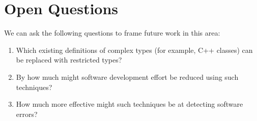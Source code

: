 \documentclass{eceasst}
\begin{document}
\section{Open Questions}

We can ask the following questions to frame future work in this area:

\begin{enumerate}

\item Which existing definitions of complex types (for example, C++
classes) can be replaced with restricted types?

\item By how much might software development effort be reduced using such techniques?

\item How much more effective might such techniques be at detecting software errors?

\end{enumerate}




\end{document}
